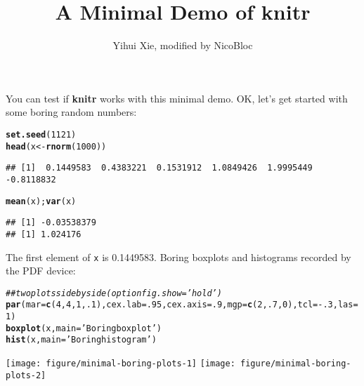 \documentclass{article}\usepackage[]{graphicx}\usepackage[]{color}
\makeatletter
\newcommand{\hlnum}[1]{\textcolor[rgb]{0.686,0.059,0.569}{#1}}%
\newcommand{\hlstr}[1]{\textcolor[rgb]{0.192,0.494,0.8}{#1}}%
\newcommand{\hlcom}[1]{\textcolor[rgb]{0.678,0.584,0.686}{\textit{#1}}}%
\newcommand{\hlopt}[1]{\textcolor[rgb]{0,0,0}{#1}}%
\newcommand{\hlstd}[1]{\textcolor[rgb]{0.345,0.345,0.345}{#1}}%
\newcommand{\hlkwb}[1]{\textcolor[rgb]{0.69,0.353,0.396}{#1}}%
\newcommand{\hlkwc}[1]{\textcolor[rgb]{0.333,0.667,0.333}{#1}}%
\newcommand{\hlkwd}[1]{\textcolor[rgb]{0.737,0.353,0.396}{\textbf{#1}}}%
\newenvironment{kframe}{%
 \def\at@end@of@kframe{}%
 \ifinner\ifhmode%
  \def\at@end@of@kframe{\end{minipage}}%
  \begin{minipage}{\columnwidth}%
 \fi\fi%
 \def\FrameCommand##1{\hskip\@totalleftmargin \hskip-\fboxsep
 \colorbox{shadecolor}{##1}\hskip-\fboxsep
     \hskip-\linewidth \hskip-\@totalleftmargin \hskip\columnwidth}%
 \MakeFramed {\advance\hsize-\width
   \@totalleftmargin\z@ \linewidth\hsize
   \@setminipage}}%
 {\par\unskip\endMakeFramed%
 \at@end@of@kframe}
\newenvironment{knitrout}{}{} %
\makeatother
\begin{document}
\title{A Minimal Demo of knitr}

\author{Yihui Xie, modified by NicoBloc}

\maketitle
You can test if \textbf{knitr} works with this minimal demo. OK, let's
get started with some boring random numbers:

\begin{knitrout}
\color{fgcolor}\begin{kframe}
\begin{alltt}
\hlkwd{set.seed}\hlstd{(}\hlnum{1121}\hlstd{)}
\hlkwd{head}\hlstd{(x} \hlkwb{<-} \hlkwd{rnorm}\hlstd{(}\hlnum{1000}\hlstd{))}
\end{alltt}
\begin{verbatim}
## [1]  0.1449583  0.4383221  0.1531912  1.0849426  1.9995449 -0.8118832
\end{verbatim}
\begin{alltt}
\hlkwd{mean}\hlstd{(x);} \hlkwd{var}\hlstd{(x)}
\end{alltt}
\begin{verbatim}
## [1] -0.03538379
## [1] 1.024176
\end{verbatim}
\end{kframe}
\end{knitrout}

The first element of \texttt{x} is 0.1449583. Boring boxplots
and histograms recorded by the PDF device:

\begin{knitrout}
\color{fgcolor}\begin{kframe}
\begin{alltt}
\hlcom{## two plots side by side (option fig.show='hold')}
\hlkwd{par}\hlstd{(}\hlkwc{mar}\hlstd{=}\hlkwd{c}\hlstd{(}\hlnum{4}\hlstd{,} \hlnum{4}\hlstd{,} \hlnum{1}\hlstd{,} \hlnum{.1}\hlstd{),}\hlkwc{cex.lab}\hlstd{=}\hlnum{.95}\hlstd{,}\hlkwc{cex.axis}\hlstd{=}\hlnum{.9}\hlstd{,}\hlkwc{mgp}\hlstd{=}\hlkwd{c}\hlstd{(}\hlnum{2}\hlstd{,}\hlnum{.7}\hlstd{,}\hlnum{0}\hlstd{),}\hlkwc{tcl}\hlstd{=}\hlopt{-}\hlnum{.3}\hlstd{,}\hlkwc{las}\hlstd{=}\hlnum{1}\hlstd{)}
\hlkwd{boxplot}\hlstd{(x,} \hlkwc{main}\hlstd{=}\hlstr{'Boring boxplot'}\hlstd{)}
\hlkwd{hist}\hlstd{(x,} \hlkwc{main}\hlstd{=}\hlstr{'Boring histogram'}\hlstd{)}
\end{alltt}
\end{kframe}

{\centering \texttt{[image: figure/minimal-boring-plots-1]} 
\texttt{[image: figure/minimal-boring-plots-2]} 

}



\end{knitrout}
\end{document}

